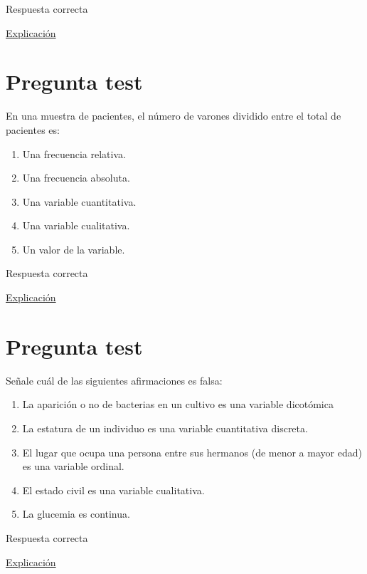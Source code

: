 \documentclass[
]{book}
\providecommand{\tightlist}{%
  \setlength{\itemsep}{0pt}\setlength{\parskip}{0pt}}
\begin{document}
Respuesta correcta

\href{https://1fjmanzano.github.io/bioestadistica/me\%CC\%81todos-de-muestreo.html}{Explicación}

\hypertarget{pregunta-test-4}{%
\section{Pregunta test}\label{pregunta-test-4}}

En una muestra de pacientes, el número de varones dividido entre el total de pacientes es:

\begin{enumerate}
\def\labelenumi{\alph{enumi})}
\tightlist
\item
  Una frecuencia relativa.
\item
  Una frecuencia absoluta.
\item
  Una variable cuantitativa.
\item
  Una variable cualitativa.
\item
  Un valor de la variable.
\end{enumerate}

Respuesta correcta

\href{https://1fjmanzano.github.io/bioestadistica/tablas-de-frecuencias.html}{Explicación}

\hypertarget{pregunta-test-5}{%
\section{Pregunta test}\label{pregunta-test-5}}

Señale cuál de las siguientes afirmaciones es falsa:

\begin{enumerate}
\def\labelenumi{\alph{enumi})}
\tightlist
\item
  La aparición o no de bacterias en un cultivo es una variable dicotómica
\item
  La estatura de un individuo es una variable cuantitativa discreta.
\item
  El lugar que ocupa una persona entre sus hermanos (de menor a mayor edad) es una variable ordinal.
\item
  El estado civil es una variable cualitativa.
\item
  La glucemia es continua.
\end{enumerate}

Respuesta correcta

\href{https://1fjmanzano.github.io/bioestadistica/tipos-de-variables.html}{Explicación}
\end{document}
